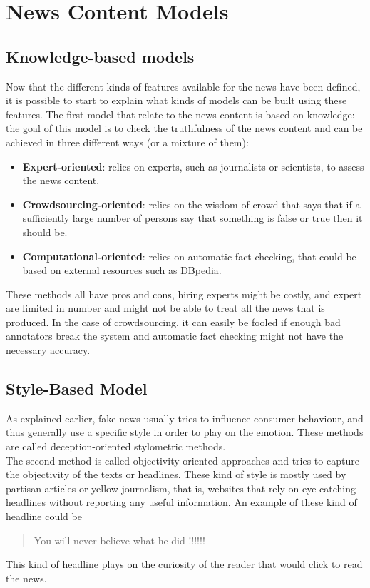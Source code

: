 \section{News Content Models} \label{intro:models}
\subsection{Knowledge-based models}
Now that the different kinds of features available for the news have been defined, it is possible to start to explain what kinds of models can be built using these features. The first model that relate to the news content is based on knowledge: the goal of this model is to check the truthfulness of the news content and can be achieved in three different ways (or a mixture of them):

\begin{itemize}
 \item \textbf{Expert-oriented}: relies on experts, such as journalists or scientists, to assess the news content.
 \item \textbf{Crowdsourcing-oriented}: relies on the wisdom of crowd that says that if a sufficiently large number of persons say that something is false or true then it should be.
 \item \textbf{Computational-oriented}: relies on automatic fact checking, that could be based on external resources such as DBpedia.
\end{itemize}
These methods all have pros and cons, hiring experts might be costly, and expert are limited in number and might not be able to treat all the news that is produced. In the case of crowdsourcing, it can easily be fooled if enough bad annotators break the system and automatic fact checking might not have the necessary accuracy.

\subsection{Style-Based Model}
As explained earlier, fake news usually tries to influence consumer behaviour, and thus generally use a specific style in order to play on the emotion. These methods are called deception-oriented stylometric methods. \\

The second method is called objectivity-oriented approaches and tries to capture the objectivity of the texts or headlines. These kind of style is mostly used by partisan articles or yellow journalism, that is, websites that rely on eye-catching headlines without reporting any useful information. An example of these kind of headline could be
 \begin{quote}You will never believe what he did !!!!!!\end{quote} 
This kind of headline plays on the curiosity of the reader that would click to read the news.

